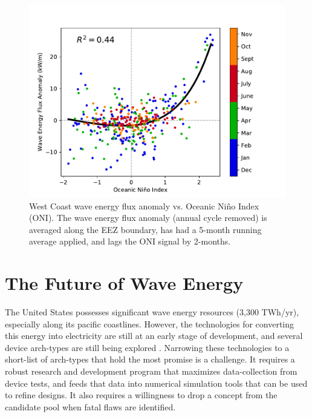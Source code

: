 \begin{figure}[ht]
  \centering
  \includegraphics[width=\textwidth]{./fig/ENSO-Comparison.wc.pdf}
  \caption{West Coast wave energy flux anomaly vs. Oceanic Ni\~{n}o Index (ONI). The wave energy flux anomaly (annual cycle removed) is averaged along the EEZ boundary, has had a 5-month running average applied, and lags the ONI signal by 2-months.}
  \label{fig:wc-nino}
\end{figure}

\section{The Future of Wave Energy}
\label{sec:future}

The United States possesses significant wave energy resources (3,300 TWh/yr), especially along its pacific coastlines. However, the technologies for converting this energy into electricity are still at an early stage of development, and several device arch-types are still being explored \citep{babaritOceanWaveEnergy2017}. Narrowing these technologies to a short-list of arch-types that hold the most promise is a challenge. It requires a robust research and development program that maximizes data-collection from device tests, and feeds that data into numerical simulation tools that can be used to refine designs. It also requires a willingness to drop a concept from the candidate pool when fatal flaws are identified.

